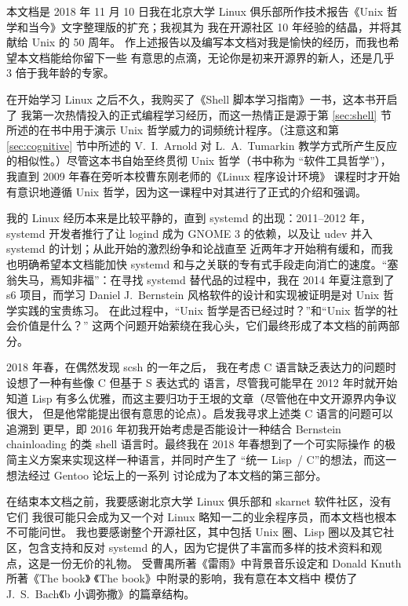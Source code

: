 \documentclass[UTF8]{ctexart}
\begin{document}
本文档是 2018 年 11 月 10 日我在北京大学 Linux 俱乐部所作技术报告《Unix
哲学和当今》\nolinebreak{}文字整理版的扩充；我视其为
我在开源社区 10 年经验的结晶，并将其献给 Unix 的 50 周年。
作上述报告以及编写本文档对我是愉快的经历，而我也希望本文档能给你留下一些
有意思的点滴，无论你是初来开源界的新人，还是几乎 3 倍于我年龄的专家。





\newpart
\printbibliography[heading = bibintoc, title = 参考资料]
\newpart
{}\label{sec:afterword}

在开始学习 Linux 之后不久，我购买了《Shell 脚本学习指南》一书，这本书开启了
我第一次热情投入的正式编程学习经历，而这一热情正是源于第 \ref{sec:shell}
节所述的在书中用于演示 Unix 哲学威力的词频统计程序。（注意这和第
\ref{sec:cognitive} 节中所述的 V.~I.\ Arnold 对 L.~A.\ Tumarkin
教学方式所产生反应的相似性。）尽管这本书自始至终贯彻 Unix 哲学（书中称为
“软件工具哲学”），我直到 2009 年春在旁听本校曹东刚老师的《Linux 程序设计环境》
课程时才开始有意识地遵循 Unix 哲学，因为这一课程中对其进行了正式的介绍和强调。

我的 Linux 经历本来是比较平静的，直到 systemd 的出现：2011--2012 年，systemd
开发者推行了让 logind 成为 GNOME 3 的依赖，以及让
udev 并入 systemd 的计划；从此开始的激烈纷争和论战直至
近两年才开始稍有缓和，而我也明确希望本文档能加快
systemd 和与之关联的专有式手段走向消亡的速度。“塞翁失马，焉知非福”：在寻找
systemd 替代品的过程中，我在 2014 年夏注意到了 s6 项目，而学习 Daniel
J.\ Bernstein 风格软件的设计和实现被证明是对 Unix 哲学实践的宝贵练习。
在此过程中，“Unix 哲学是否已经过时？”和“Unix 哲学的社会价值是什么？”
这两个问题开始萦绕在我心头，它们最终形成了本文档的前两部分。

2018 年春，在偶然发现 scsh 的一年之后，
我在考虑 C 语言缺乏表达力的问题时设想了一种有些像 C 但基于 S 表达式的
语言，尽管我可能早在 2012 年时就开始知道 Lisp
有多么优雅，而这主要归功于王垠的文章（尽管他在中文开源界内争议很大，
但是他常能提出很有意思的论点）。启发我寻求上述类 C 语言的问题可以追溯到
更早，即 2016 年初我开始考虑是否能设计一种结合 Bernstein chainloading 的类
shell 语言时。最终我在 2018 年春想到了一个可实际操作
的极简主义方案来实现这样一种语言，并同时产生了
“统一 Lisp~/ C”的想法，而这一想法经过 Gentoo 论坛上的一系列
讨论成为了本文档的第三部分。

在结束本文档之前，我要感谢北京大学 Linux 俱乐部和 skarnet 软件社区，没有它们
我很可能只会成为又一个对 Linux 略知一二的业余程序员，而本文档也根本不可能问世。
我也要感谢整个开源社区，其中包括 Unix 圈、Lisp 圈以及其它社区，包含支持和反对
systemd 的人，因为它提供了丰富而多样的技术资料和观点，这是一份无价的礼物。
受曹禺所著《雷雨》中背景音乐设定和 Donald Knuth 所著《The book》%
《The book》中附录的影响，我有意在本文档中
模仿了 J.~S.\ Bach《b 小调弥撒》的篇章结构。
\end{document}
